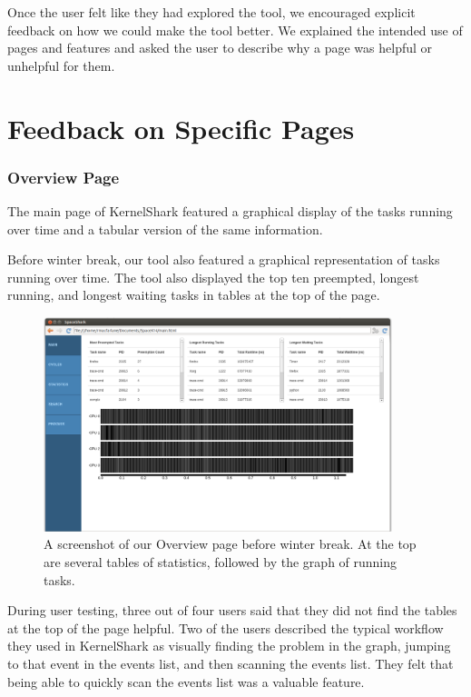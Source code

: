 \documentclass{hmcclinic}
\begin{document}
Once the user felt like they had explored the tool, we encouraged explicit
feedback on how we could make the tool better. We explained the intended use of
pages and features and asked the user to describe why a page was helpful or
unhelpful for them.

\section{Feedback on Specific Pages} %

\subsubsection{Overview Page}

The main page of KernelShark featured a graphical display of the tasks
running over time and a tabular version of the same information.

Before winter break, our tool also featured a graphical representation of tasks
running over time. The tool also displayed the top ten preempted, longest
running, and longest waiting tasks in tables at the top of the page. 

\begin{figure}[H]
\begin{center}
\includegraphics[width=4in]{oldMain.png}
\caption{A screenshot of our Overview page before winter break. At the top are
several tables of statistics, followed by the graph of running tasks.}
\end{center}
\end{figure}

During user testing, three out of four users said that they did not find the
tables at the top of the page helpful. Two of the users described the typical
workflow they used in KernelShark as visually finding the problem in the graph,
jumping to that event in the events list, and then scanning the events list.
They felt that being able to quickly scan the events list was a valuable
feature.
\end{document}
